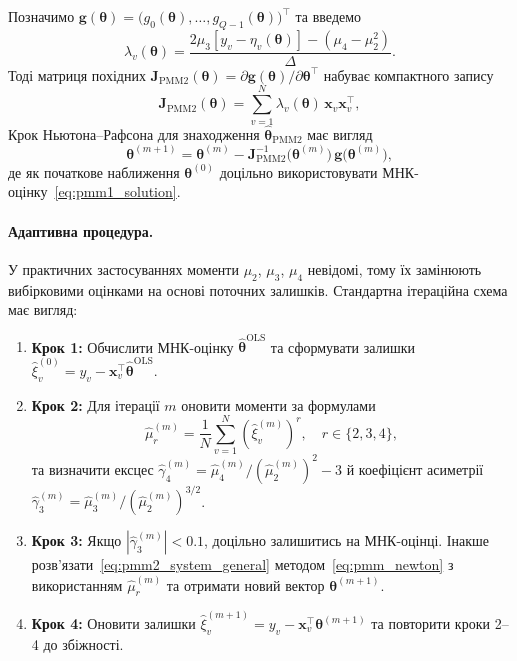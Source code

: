 \documentclass[12pt,a4paper]{article}
\begin{document}
Позначимо $\boldsymbol{g}(\boldsymbol{\theta}) = \big(g_0(\boldsymbol{\theta}), \ldots, g_{Q-1}(\boldsymbol{\theta}) \big)^\top$ та введемо
\begin{equation}
\label{eq:lambda_definition}
\lambda_v(\boldsymbol{\theta}) = \frac{2\mu_3 \left[ y_v - \eta_v(\boldsymbol{\theta}) \right] - \left(\mu_4 - \mu_2^2\right)}{\Delta}.
\end{equation}
Тоді матриця похідних $\mathbf{J}_{\mathrm{PMM2}}(\boldsymbol{\theta}) = \partial \boldsymbol{g}(\boldsymbol{\theta}) / \partial \boldsymbol{\theta}^\top$ набуває компактного запису
\begin{equation}
\label{eq:pmm2_jacobian}
\mathbf{J}_{\mathrm{PMM2}}(\boldsymbol{\theta}) = \sum_{v=1}^{N} \lambda_v(\boldsymbol{\theta})\, \boldsymbol{x}_v \boldsymbol{x}_v^\top,
\end{equation}
Крок Ньютона--Рафсона для знаходження $\hat{\boldsymbol{\theta}}_{\mathrm{PMM2}}$ має вигляд
\begin{equation}
\label{eq:pmm_newton}
\boldsymbol{\theta}^{(m+1)} = \boldsymbol{\theta}^{(m)} - \mathbf{J}_{\mathrm{PMM2}}^{-1}\big(\boldsymbol{\theta}^{(m)}\big)\, \boldsymbol{g}\big(\boldsymbol{\theta}^{(m)}\big),
\end{equation}
де як початкове наближення $\boldsymbol{\theta}^{(0)}$ доцільно використовувати МНК-оцінку~\eqref{eq:pmm1_solution}.

\paragraph{Адаптивна процедура.}

У практичних застосуваннях моменти $\mu_2$, $\mu_3$, $\mu_4$ невідомі, тому їх замінюють вибірковими оцінками на основі поточних залишків. Стандартна ітераційна схема має вигляд:
\begin{enumerate}
    \item \textbf{Крок 1:} Обчислити МНК-оцінку $\hat{\boldsymbol{\theta}}^{\mathrm{OLS}}$ та сформувати залишки $\hat{\xi}_v^{(0)} = y_v - \boldsymbol{x}_v^\top \hat{\boldsymbol{\theta}}^{\mathrm{OLS}}$.
    \item \textbf{Крок 2:} Для ітерації $m$ оновити моменти за формулами
    \[
    \hat{\mu}_r^{(m)} = \frac{1}{N} \sum_{v=1}^{N} \left(\hat{\xi}_v^{(m)}\right)^r,\quad r \in \{2,3,4\},
    \]
    та визначити ексцес $\hat{\gamma}_4^{(m)} = \hat{\mu}_4^{(m)} / (\hat{\mu}_2^{(m)})^2 - 3$ й коефіцієнт асиметрії $\hat{\gamma}_3^{(m)} = \hat{\mu}_3^{(m)} / (\hat{\mu}_2^{(m)})^{3/2}$.
    \item \textbf{Крок 3:} Якщо $|\hat{\gamma}_3^{(m)}| < 0.1$, доцільно залишитись на МНК-оцінці. Інакше розв'язати~\eqref{eq:pmm2_system_general} методом~\eqref{eq:pmm_newton} з використанням $\hat{\mu}_r^{(m)}$ та отримати новий вектор $\boldsymbol{\theta}^{(m+1)}$.
    \item \textbf{Крок 4:} Оновити залишки $\hat{\xi}_v^{(m+1)} = y_v - \boldsymbol{x}_v^\top \boldsymbol{\theta}^{(m+1)}$ та повторити кроки 2--4 до збіжності.
\end{enumerate}
\end{document}
